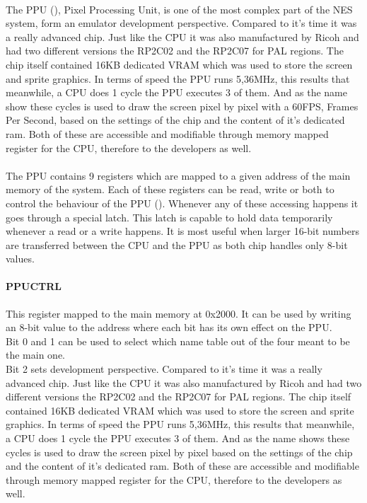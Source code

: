 \documentclass[]{report}
\begin{document}
\paragraph{ }
The PPU (\cite{NDPP}), Pixel Processing Unit, is one of the most complex part of the NES system, form an emulator development perspective. Compared to it's time it was a really advanced chip. Just like the CPU it was also manufactured by Ricoh and had two different versions the RP2C02 and the RP2C07 for PAL regions. The chip itself contained 16KB dedicated VRAM which was used to store the screen and sprite graphics. In terms of speed the PPU runs 5,36MHz, this results that meanwhile, a CPU does 1 cycle the PPU executes 3 of them. And as the name show these cycles is used to draw the screen pixel by pixel with a 60FPS, Frames Per Second, based on the settings of the chip and the content of it's dedicated ram. Both of these are accessible and modifiable through memory mapped register for the CPU, therefore to the developers as well.

\paragraph{ }
The PPU contains 9 registers which are mapped to a given address of the main memory of the system. Each of these registers can be read, write or both to control the behaviour of the PPU (\cite{PPRG}). Whenever any of these accessing happens it goes through a special latch. This latch is capable to hold data temporarily whenever a read or a write happens. It is most useful when larger 16-bit numbers are transferred between the CPU and the PPU as both chip handles only 8-bit values.

\paragraph{PPUCTRL}
This register mapped to the main memory at 0x2000. It can be used by writing an 8-bit value to the address where each bit has its own effect on the PPU.
\\
Bit 0 and 1 can be used to select which name table out of the four meant to be the main one.
\\
Bit 2 sets development perspective. Compared to it's time it was a really advanced chip. Just like the CPU it was also manufactured by Ricoh and had two different versions the RP2C02 and the RP2C07 for PAL regions. The chip itself contained 16KB dedicated VRAM which was used to store the screen and sprite graphics. In terms of speed the PPU runs 5,36MHz, this results that meanwhile, a CPU does 1 cycle the PPU executes 3 of them. And as the name shows these cycles is used to draw the screen pixel by pixel based on the settings of the chip and the content of it's dedicated ram. Both of these are accessible and modifiable through memory mapped register for the CPU, therefore to the developers as well.
\end{document}

